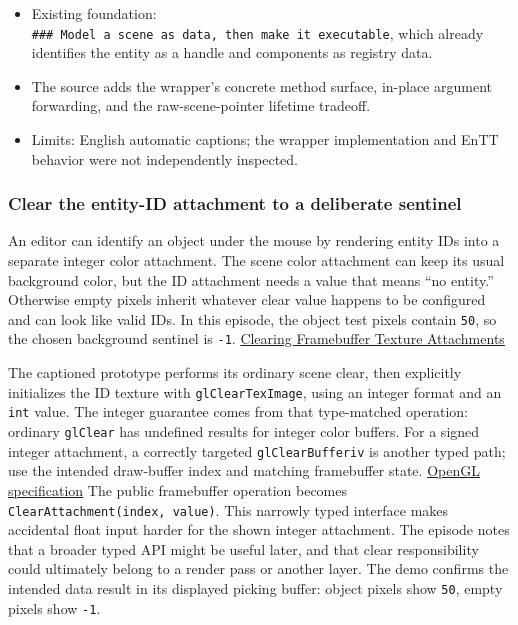 \begin{itemize}
\tightlist
\item
  Existing foundation: \texttt{\#\#\#\ Model\ a\ scene\ as\ data,\ then\ make\ it\ executable}, which already identifies the entity as a handle and components as registry data.
\item
  The source adds the wrapper's concrete method surface, in-place argument forwarding, and the raw-scene-pointer lifetime tradeoff.
\item
  Limits: English automatic captions; the wrapper implementation and EnTT behavior were not independently inspected.
\end{itemize}

\subsubsection{Clear the entity-ID attachment to a deliberate sentinel}\label{clear-the-entity-id-attachment-to-a-deliberate-sentinel}

An editor can identify an object under the mouse by rendering entity IDs into a separate integer color attachment. The scene color attachment can keep its usual background color, but the ID attachment needs a value that means ``no entity.'' Otherwise empty pixels inherit whatever clear value happens to be configured and can look like valid IDs. In this episode, the object test pixels contain \texttt{50}, so the chosen background sentinel is \texttt{-1}. \href{https://www.youtube.com/watch?v=LPhBiIvDOs0}{Clearing Framebuffer Texture Attachments}

The captioned prototype performs its ordinary scene clear, then explicitly initializes the ID texture with \texttt{glClearTexImage}, using an integer format and an \texttt{int} value. The integer guarantee comes from that type-matched operation: ordinary \texttt{glClear} has undefined results for integer color buffers. For a signed integer attachment, a correctly targeted \texttt{glClearBufferiv} is another typed path; use the intended draw-buffer index and matching framebuffer state. \href{https://registry.khronos.org/OpenGL/specs/gl/glspec30.pdf}{OpenGL specification} The public framebuffer operation becomes \texttt{ClearAttachment(index,\ value)}. This narrowly typed interface makes accidental float input harder for the shown integer attachment. The episode notes that a broader typed API might be useful later, and that clear responsibility could ultimately belong to a render pass or another layer. The demo confirms the intended data result in its displayed picking buffer: object pixels show \texttt{50}, empty pixels show \texttt{-1}.

